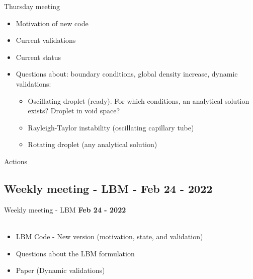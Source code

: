 \documentclass{beamer}
\begin{document}
	\begin{frame}{Thursday meeting}
		\begin{itemize}
			\item Motivation of new code
			\item Current validations
			\item Current status
			\item Questions about: boundary conditions, global density increase, dynamic validations:
			\begin{itemize}
				\item Oscillating droplet (ready). For which conditions, an analytical solution exists? Droplet in void space?
				\item Rayleigh-Taylor instability (oscillating capillary tube)
				\item Rotating droplet (any analytical solution)
			\end{itemize}
		\end{itemize}
	\end{frame}
	
	
	
	\begin{frame}{Actions}

	\end{frame}


	\subsection{Weekly meeting - LBM - Feb 24 - 2022}
	\label{}
	\justifying
	\begin{frame}{Weekly meeting - LBM}
		\textbf{Feb 24 - 2022}\\~\\
		\begin{itemize}
			\item LBM Code - New version (motivation, state, and validation)
			
			\item Questions about the LBM formulation
		
			\item Paper (Dynamic validations)
		\end{itemize}
	\end{frame}
	
\end{document}
